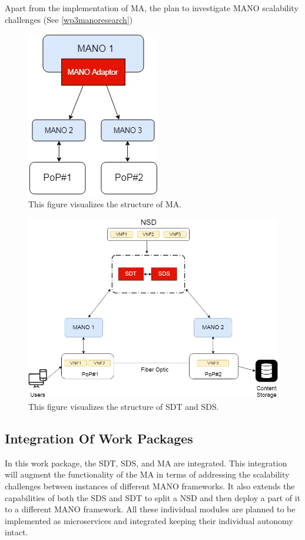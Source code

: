 Apart from the implementation of MA, the plan to investigate MANO scalability challenges (See \ref{wp3manoresearch})

\begin{figure}[h]
	\centering
	\includegraphics[width=0.29\linewidth]{figures/Structure2}
	\caption{This figure visualizes the structure of MA. }
	\label{fig:structure2}
\end{figure}

\begin{figure}[h]
	\centering
	\includegraphics[width=0.7\linewidth]{figures/Structure1}
	\caption{This figure visualizes the structure of SDT and SDS. }
	\label{fig:structure1}
\end{figure}

\subsection{Integration Of Work Packages}
In this work package, the SDT, SDS, and MA are integrated. This integration will augment the functionality of the MA in terms of addressing the scalability challenges between instances of different MANO frameworks. It also extends the capabilities of both the SDS and SDT to split a NSD and then deploy a part of it to a different MANO framework. All these individual modules are planned to be implemented as microservices and integrated keeping their individual autonomy intact. 


